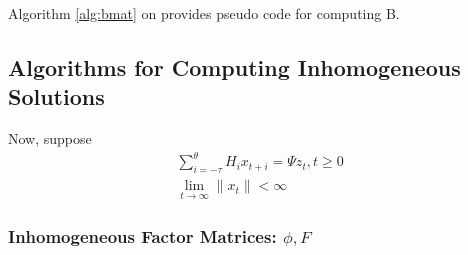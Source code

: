 \documentclass[12pt]{article}
\begin{document}
Algorithm \ref{alg:bmat} on \pageref{alg:bmat} provides pseudo code for computing B.

\subsection{Algorithms for Computing Inhomogeneous Solutions }
\label{inhomo}
Now, suppose
\begin{gather}\label{eq:inhomog}
\sum_{i= - \tau}^\theta{ H_i  x_{ t + i } }= \Psi{} z_{t}, t \geq0\\
\lim_{ t \rightarrow\infty} \|x_t\|   < \infty
\end{gather}





\subsubsection{Inhomogeneous Factor Matrices: $\phi, F$}
\label{sec:inhomofactor}
\label{sec:inhomog}
\end{document}
